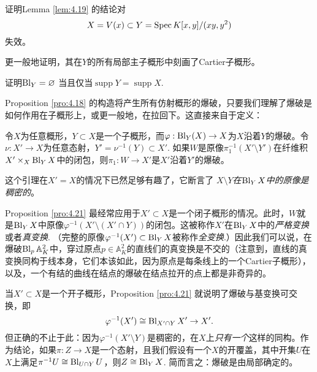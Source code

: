 \begin{exe}\label{exe:4.20}
	\begin{compactenum}[(a)]
		\item 证明Lemma \ref{lem:4.19} 的结论对
		\[
			X=V(x)\subset Y=\operatorname{Spec} K[x,y]/(xy,y^2)
		\]
		失效。
		\item 更一般地证明，其在$Y$的所有局部主子概形中刻画了Cartier子概形。
		\item 证明$\operatorname{Bl}_Y=\varnothing$ 当且仅当$\operatorname{supp} Y=\operatorname{supp} X$.
	\end{compactenum}
\end{exe}

Proposition \ref{pro:4.18} 的构造将产生所有仿射概形的爆破，只要我们理解了爆破是如何作用在子概形上，或更一般地，在拉回下。这直接来自于定义：

\begin{pro}\label{pro:4.21}
	令$X$为任意概形，$Y\subset X$是一个子概形，而$\varphi:\operatorname{Bl}_Y(X)\to X$为$X$沿着$Y$的爆破。令$\nu:X'\to X$为任意态射，$Y'=\nu^{-1}(Y)\subset X'$. 如果$W$是原像$\pi_1^{-1}(X'\setminus Y')$在纤维积$X'\times_X \operatorname{Bl}_Y X$中的闭包，则$\pi_1:W\to X'$是$X'$沿着$Y'$的爆破。
\end{pro}


这个引理在$X'=X$的情况下已然足够有趣了，它断言了 \textit{$X\setminus Y$在$\operatorname{Bl}_Y X$中的原像是稠密的}。

Proposition \ref{pro:4.21} 最经常应用于$X'\subset X$是一个闭子概形的情况。此时，$W$就是$\operatorname{Bl}_Y X$中原像$\varphi^{-1}(X'\setminus (X'\cap Y))$的闭包。这被称作$X'$在$\operatorname{Bl}_Y X$中的\textit{严格变换}或者\textit{真变换}. （完整的原像$\varphi^{-1}(X')\subset \operatorname{Bl}_Y X$被称作\textit{全变换}.）因此我们可以说，在爆破$\operatorname{Bl}_p \mathbb A_K^2$中，穿过原点$p\in \mathbb A_K^2$的直线们的真变换是不交的（注意到，直线的真变换同构于线本身，它们本该如此，因为原点是每条线上的一个Cartier子概形），以及，一个有结的曲线在结点的爆破在结点拉开的点上都是非奇异的。

当$X'\subset X$是一个开子概形，Proposition \ref{pro:4.21} 就说明了爆破与基变换可交换，即
\[
	\varphi^{-1}(X')\cong \operatorname{Bl}_{X'\cap Y}X'\to X'.
\]
但正确的不止于此：因为$\varphi^{-1}(X'\setminus Y)$是稠密的，在$X$上\textit{只有一个}这样的同构。作为结论，如果$\pi:Z\to X$是一个态射，且我们假设有一个$X$的开覆盖，其中开集$U$在$X$上满足$\pi^{-1}U\cong \operatorname{Bl}_{U\cap Y}U$，则$Z\cong \operatorname{Bl}_Y X$. 简而言之：爆破是由局部确定的。

